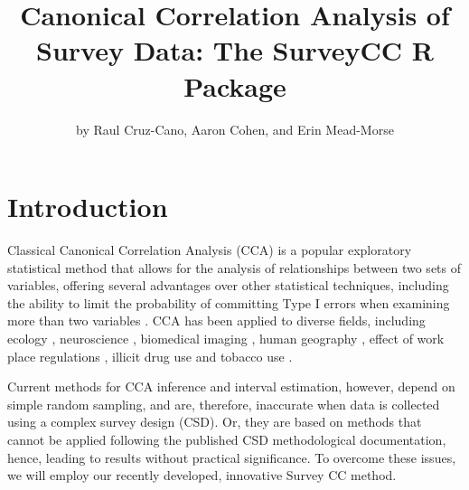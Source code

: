 \title{Canonical Correlation Analysis of Survey Data: The SurveyCC R Package}


\author{by Raul Cruz-Cano, Aaron Cohen, and Erin Mead-Morse}

\maketitle


\hypertarget{introduction}{%
\section{Introduction}\label{introduction}}

Classical Canonical Correlation Analysis (CCA) is a popular exploratory statistical method that allows for the analysis of relationships between two sets of variables, offering several advantages over other statistical techniques, including the ability to limit the probability of committing Type I errors when examining more than two variables \citep{hair2013}. CCA has been applied to diverse fields, including ecology \citep{git2012}, neuroscience \citep{zhuang2020}, biomedical imaging \citep{correa2008}, human geography \citep{clark1975}, effect of work place regulations \citep{bor1991}, illicit drug use \citep{deleo2013} and tobacco use \citep{morris2018}.

Current methods for CCA inference and interval estimation, however, depend on simple random
sampling, and are, therefore, inaccurate when data is collected using a complex survey design (CSD). Or, they are based on methods that cannot be applied following the published CSD methodological documentation, hence, leading to results without practical significance. To overcome these issues, we will employ our recently developed, innovative Survey CC method.

